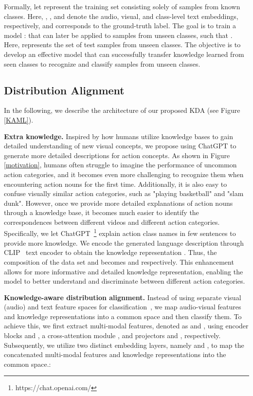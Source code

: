 \documentclass[10pt,twocolumn,letterpaper]{article}
\begin{document}
Formally, let  represent the training set consisting solely of samples from known classes. Here, , , and  denote the audio, visual, and class-level text embeddings, respectively, and  corresponds to the ground-truth label.
The goal is to train a model :  that can later be applied to samples from unseen classes, such that . Here,  represents the set of test samples from unseen classes. The objective is to develop an effective model that can successfully transfer knowledge learned from seen classes to recognize and classify samples from unseen classes.


\subsection{Distribution Alignment}
In the following, we describe the architecture of our proposed KDA (see Figure \ref{KAML}).

\noindent
\textbf{Extra knowledge.} 
Inspired by how humans utilize knowledge bases to gain detailed understanding of new visual concepts, we propose using ChatGPT to generate more detailed descriptions for action concepts. As shown in Figure \ref{motivation}, humans often struggle to imagine the performance of uncommon action categories, and it becomes even more challenging to recognize them when encountering action nouns for the first time. Additionally, it is also easy to confuse visually similar action categories, such as "playing basketball" and "slam dunk". However, once we provide more detailed explanations of action nouns through a knowledge base, it becomes much easier to identify the correspondences between different videos and different action categories. 
Specifically, we let ChatGPT~\footnote{https://chat.openai.com/\label{gpt}} explain action class names in few sentences to provide more knowledge. We encode the generated language description through CLIP~\cite{clip} text encoder to obtain the knowledge representation . Thus, the composition of the data set  and  becomes  and  respectively. This enhancement allows for more informative and detailed knowledge representation, enabling the model to better understand and discriminate between different action categories.



\noindent
\textbf{Knowledge-aware distribution alignment.} Instead of using separate visual (audio) and text feature spaces for classification~\cite{AVCA,HyperbolicAV}, we map audio-visual features and knowledge representations into a common space and then classify them. 
To achieve this, we first extract multi-modal features, denoted as  and , using encoder blocks  and , a cross-attention module , and projectors  and , respectively.
Subsequently, we utilize two distinct embedding layers, namely  and , to map the concatenated multi-modal features  and knowledge representations  into the common space.:
\end{document}
